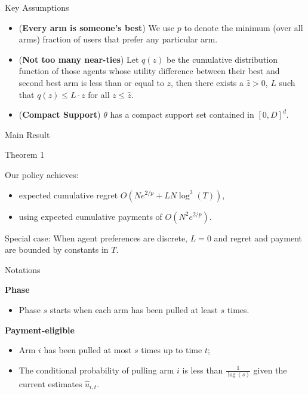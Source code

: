 \documentclass[serif]{beamer}
\begin{document}
\begin{frame}{Key Assumptions}
\begin{itemize}[label=\textbullet]
\item (\textbf{Every arm is someone's best}) We use $p$ to denote the minimum (over all arms) fraction of users that prefer any particular arm.
\vspace{0.2cm}
\item (\textbf{Not too many near-ties}) Let $q(z)$ be the cumulative distribution function of those agents whose utility difference between their best and second best arm is less than or equal to $z$, then there exists a $\hat{z}>0$, $L$ such that $q(z)\leq L\cdot z$ for all $z\leq \hat{z}$.
\vspace{0.2cm}
\item (\textbf{Compact Support}) $\theta$ has a compact support set contained in $[0,D]^{d}$.\
\end{itemize}

\end{frame}

\begin{frame}{Main Result}
\begin{block}{Theorem 1}

Our policy achieves:
\begin{itemize}
\item expected cumulative regret $O (N e^{2/p} + L N \log^3(T))$,
\item using expected cumulative payments of $O(N^2 e^{2/p})$.
\end{itemize}
\end{block}

Special case: 
When agent preferences are discrete, $L=0$ and
regret and payment are bounded by constants in $T$.



\end{frame}
\begin{frame}{Notations}

\textbf{Phase}
\begin{itemize}[label=\textbullet]
\item Phase $s$ starts when each arm has been pulled at least $s$ times.
\end{itemize}

\vspace{0.7cm}
\textbf{Payment-eligible}
\begin{itemize}[label=\textbullet]
\item Arm $i$ has been pulled at most $s$ times up to time $t$;
\item The conditional probability of pulling arm $i$ is less than $\frac{1}{\log(s)}$ given the current estimates $\hat{u}_{i,t}$.
\end{itemize}

\end{frame}
\end{document}
